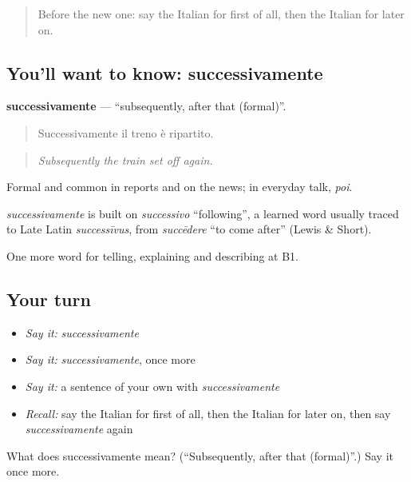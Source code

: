 \begin{quote}
Before the new one: say the Italian for first of all, then the Italian for later on.
\end{quote}

\subsection*{You'll want to know: successivamente}
\textbf{successivamente} — \textquotedblleft{}subsequently, after that (formal)\textquotedblright{}.

\begin{quote}
Successivamente il treno è ripartito.
\end{quote}

\begin{quote}
\emph{Subsequently the train set off again.}
\end{quote}

Formal and common in reports and on the news; in everyday talk, \emph{poi}.

\begin{cousinweb}
\emph{successivamente} is built on \emph{successivo} \textquotedblleft{}following\textquotedblright{}, a learned word usually traced to Late Latin \emph{successīvus}, from \emph{succēdere} \textquotedblleft{}to come after\textquotedblright{} (Lewis \& Short).
\end{cousinweb}

\begin{grammarlens}[title={What you've built}]
One more word for telling, explaining and describing at B1.
\end{grammarlens}

\subsection*{Your turn}
\begin{itemize}
\raggedright
  \item \emph{Say it:} \emph{successivamente}
  \item \emph{Say it:} \emph{successivamente}, once more
  \item \emph{Say it:} a sentence of your own with \emph{successivamente}
  \item \emph{Recall:} say the Italian for first of all, then the Italian for later on, then say \emph{successivamente} again
\end{itemize}

\begin{tcolorbox}[breakable,colback=teal!4,colframe=teal!35!black,title={Before you move on}]
What does successivamente mean? (\textquotedblleft{}Subsequently, after that (formal)\textquotedblright{}.) Say it once more.
\end{tcolorbox}
